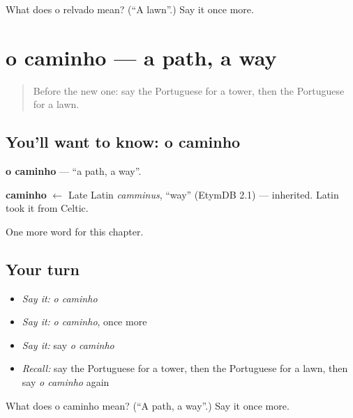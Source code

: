 \begin{tcolorbox}[breakable,colback=teal!4,colframe=teal!35!black,title={Before you move on}]
What does o relvado mean? (\textquotedblleft{}A lawn\textquotedblright{}.) Say it once more.
\end{tcolorbox}
\section[o caminho]{o caminho — a path, a way}

\label{lesson:PT-C164-caminho}



\begin{quote}
Before the new one: say the Portuguese for a tower, then the Portuguese for a lawn.
\end{quote}

\subsection*{You'll want to know: o caminho}
\textbf{o caminho} — \textquotedblleft{}a path, a way\textquotedblright{}.

\begin{cousinweb}
\textbf{caminho} $\leftarrow$ Late Latin \emph{camminus}, \textquotedblleft{}way\textquotedblright{} (EtymDB 2.1) — inherited. Latin took it from Celtic.
\end{cousinweb}

\begin{grammarlens}[title={What you've built}]
One more word for this chapter.
\end{grammarlens}

\subsection*{Your turn}
\begin{itemize}
\raggedright
  \item \emph{Say it:} \emph{o caminho}
  \item \emph{Say it:} \emph{o caminho}, once more
  \item \emph{Say it:} say \emph{o caminho}
  \item \emph{Recall:} say the Portuguese for a tower, then the Portuguese for a lawn, then say \emph{o caminho} again
\end{itemize}

\begin{tcolorbox}[breakable,colback=teal!4,colframe=teal!35!black,title={Before you move on}]
What does o caminho mean? (\textquotedblleft{}A path, a way\textquotedblright{}.) Say it once more.
\end{tcolorbox}
